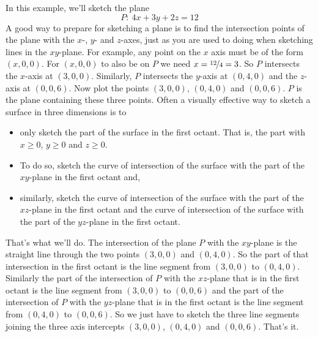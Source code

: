 \begin{eg}\label{eg:VPsketchPlane}
In this example, we'll sketch the plane 
\begin{equation*}
P:\ 4x + 3y + 2z = 12
\end{equation*}
A good way to prepare for sketching a plane is to find the intersection 
points of the plane with the $x$-, $y$- and $z$-axes, just as you are used 
to doing when sketching lines in the $xy$-plane. For example, 
any point on the $x$ axis must be of the form $(x,0,0)$. For $(x,0,0)$ 
to also be on $P$ we need $x=\nicefrac{12}{4}=3$. So $P$ intersects 
the $x$-axis at $(3,0,0)$. Similarly, $P$ intersects the $y$-axis 
at $(0,4,0)$ and the $z$-axis at $(0,0,6)$. Now plot the points 
$(3,0,0)$, $(0,4,0)$ and $(0,0,6)$. $P$ is the plane containing these 
three points. 
Often a visually effective way to sketch a surface in three dimensions
is to 
\begin{itemize}
\item only sketch the part of the surface in the first octant. That is,
the part with $x\ge0$, $y\ge 0$ and $z\ge 0$.
\item To do so, sketch the curve of intersection of the surface with
the part of the $xy$-plane in the first octant and,
\item similarly, sketch the curve of intersection of the surface with
the part of the $xz$-plane in the first octant and
the curve of intersection of the surface with
the part of the $yz$-plane in the first octant.

\end{itemize}
That's what we'll do. The intersection of the plane $P$ with the $xy$-plane
is the straight line through the two points $(3,0,0)$ and $(0,4,0)$. So
the part of that intersection in the first octant is the line segment
from $(3,0,0)$ to $(0,4,0)$. Similarly the part of the intersection of
$P$ with the $xz$-plane that is in the first octant is the line segment
from $(3,0,0)$ to $(0,0,6)$ and  the part of the intersection of
$P$ with the $yz$-plane that is in the first octant is the line segment
from $(0,4,0)$ to $(0,0,6)$. So we just have to sketch the three line segments
joining the three axis intercepts $(3,0,0)$, $(0,4,0)$ and $(0,0,6)$.
That's it.


\end{eg}
